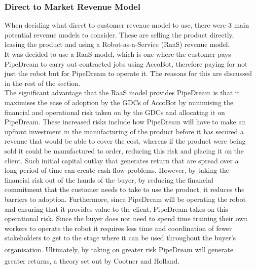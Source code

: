 \documentclass[11pt]{article}		%
\newcommand{\supercite}[1]{\textsuperscript{\cite{#1}}}		%
\begin{document}
            
            \subsubsection{Direct to Market Revenue Model}\label{revenuemodel}
            
            When deciding what direct to customer revenue model to use, there were 3 main potential revenue models to consider. These are selling the product directly, leasing the product and using a Robot-as-a-Service (RaaS) revenue model.
         \\ 
            \hspace*{2ex}
            It was decided to use a RaaS model, which is one where the customer pays PipeDream to carry out contracted jobs using AccoBot, therefore paying for not just the robot but for PipeDream to operate it. The reasons for this are discussed in the rest of the section.
            \\ 
            \hspace*{2ex}The significant advantage that the RaaS model provides PipeDream is that it maximises the ease of adoption by the GDCs of AccoBot by minimising the financial and operational risk taken on by the GDCs and allocating it on PipeDream. These increased risks include how PipeDream will have to make an upfront investment in the manufacturing of the product before it has secured a revenue that would be able to cover the cost, whereas if the product were being sold it could be manufactured to order, reducing this risk and placing it on the client. Such initial capital outlay that generates return that are spread over a long period of time can create cash flow problems. However, by taking the financial risk out of the hands of the buyer, by reducing the financial commitment that the customer needs to take to use the product, it reduces the barriers to adoption. Furthermore, since PipeDream will be operating the robot and ensuring that it provides value to the client, PipeDream takes on this operational risk. Since the buyer does not need to spend time training their own workers to operate the robot it requires less time and coordination of fewer stakeholders to get to the stage where it can be used throughout the buyer’s organisation\supercite{RaaS}. Ultimately, by taking on greater risk PipeDream will generate greater returns, a theory set out by Cootner and Holland\supercite{risk-return}.
\end{document}
